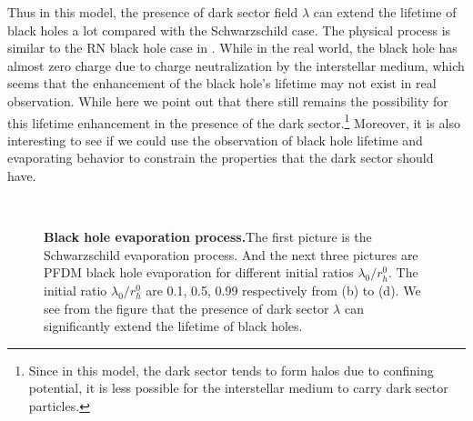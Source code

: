 \documentclass[a4paper,11pt]{article}
\begin{document}
Thus in this model, the presence of dark sector field $\lambda$ can extend the lifetime of black holes a lot compared with the Schwarzschild case. The physical process is  similar to the RN black hole case in \cite{Hiscock:1990ex,Xu:2019wak}. While in the real world, the black hole has almost zero charge due to charge neutralization by the interstellar medium, which seems that the enhancement of the black hole's lifetime may not exist in real observation. While here we point out that there still remains the possibility for this lifetime enhancement in the presence of the dark sector.\footnote{Since in this model, the dark sector tends to form halos due to confining potential, it is less possible for the interstellar medium to carry dark sector particles. } Moreover, it is also interesting to see if we could use the observation of black hole lifetime and evaporating behavior to constrain the properties that the dark sector should have. 
  \begin{figure}[!ht]
	\centering
{}
\\
 \caption{\textbf{Black hole evaporation process.}The first picture is the Schwarzschild evaporation process. And the next three pictures are PFDM black hole evaporation for different initial ratios $\lambda_{0}/r^{0}_{h}$. The initial ratio $\lambda_{0}/r^{0}_{h}$ are 0.1, 0.5, 0.99 respectively from (b) to (d). We see from the figure that the presence of dark sector $\lambda$ can significantly extend the lifetime of black holes. }
 \label{evap3}
\end{figure}



\end{document}
